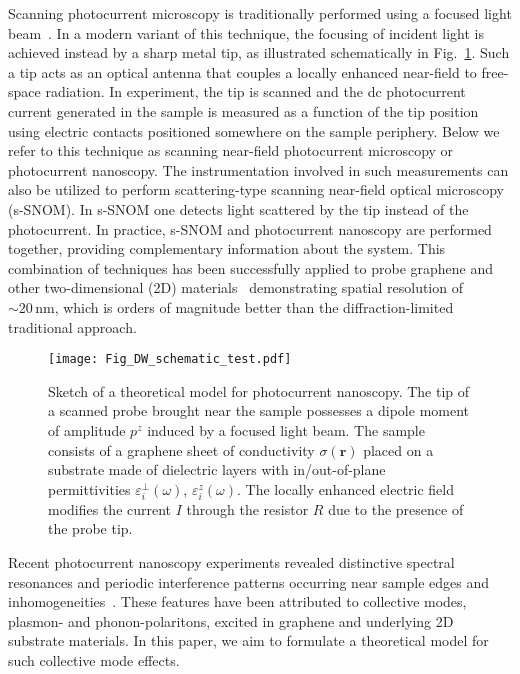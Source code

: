 \documentclass[aps, prb, reprint, superscriptaddress]{revtex4-2}
\renewcommand{\vec}{\mathbf}
\begin{document}
Scanning photocurrent microscopy is traditionally performed using a
focused light beam~\cite{Kallmann1960, Guettler1970, Marek1984, GRAHAM2013}.
In a modern variant of this technique,
the focusing of incident light is achieved instead by a sharp metal tip,
as illustrated schematically in Fig.~\ref{fig:heterostructure_schematic}.
Such a tip acts as an optical antenna that
couples a locally enhanced near-field to free-space radiation.
In experiment, the tip is scanned and the dc photocurrent current generated in the sample
is measured as a function of the tip position
using electric contacts positioned somewhere on the sample periphery.
Below we refer to this technique as scanning near-field photocurrent microscopy
or photocurrent nanoscopy.
The instrumentation involved in such measurements
can also be utilized to perform scattering-type scanning near-field optical microscopy (s-SNOM).
In s-SNOM one detects light scattered by the tip instead of the photocurrent.
In practice, s-SNOM and photocurrent nanoscopy are performed together,
providing complementary information about the system.
This combination of techniques has been successfully applied to
probe graphene and other two-dimensional (2D) materials~\cite{Basov2014, Basov2016, Ni2018, Lundeberg2017, Hesp2021}
demonstrating spatial resolution of $\sim 20\,\mathrm{nm}$,
which is
orders of magnitude better than the diffraction-limited traditional approach.

\begin{figure}[thb]
	\texttt{[image: Fig\_DW\_schematic\_test.pdf]}
	\caption{Sketch of a theoretical model for photocurrent nanoscopy.
	The tip of a scanned probe brought near the sample possesses a dipole moment of amplitude $p^z$ induced by a focused light beam. The sample consists of a graphene sheet of conductivity $\sigma(\vec{r})$ placed on a substrate made of dielectric layers with in/out-of-plane permittivities $\varepsilon^\perp_i(\omega)$, $\varepsilon^z_i(\omega)$.
	The locally enhanced electric field modifies the current $I$ through the resistor $R$ due to the presence of the probe tip. 
	}
	\label{fig:heterostructure_schematic} 
\end{figure}

Recent photocurrent nanoscopy experiments revealed
distinctive spectral resonances and periodic interference patterns occurring near sample edges and inhomogeneities~\cite{Basov2016, Ni2018, Lundeberg2017, Hesp2021}.
These features have been attributed to collective modes, plasmon- and phonon-polaritons,
excited in graphene and underlying 2D substrate materials.
In this paper, we aim to formulate a theoretical model for such collective mode effects.
\end{document}
